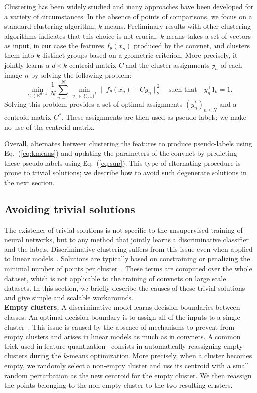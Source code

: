 Clustering has been widely studied and many approaches have been developed for a variety of circumstances. In the absence of points of comparisons,
we focus on a standard clustering algorithm, $k$-means. Preliminary results with other clustering algorithms indicates that this choice is not crucial.
$k$-means takes a set of vectors as input, in our case the features $f_\theta(x_n)$ produced by the convnet, and clusters them into $k$ distinct groups based on a geometric criterion.
More precisely, it jointly learns a $d\times k$ centroid matrix $C$ and the cluster assignments $y_n$ of each image $n$ by solving the following problem:
\begin{equation}
\label{eq:kmeans}
  \min_{C \in \mathbb{R}^{d\times k}}
  \frac{1}{N}
  \sum_{n=1}^N
  \min_{y_n \in \{0,1\}^{k}}
  \| f_\theta(x_n) -  C y_n \|_2^2
  \quad
  \text{such that}
  \quad
  y_n^\top 1_k = 1.
\end{equation}
Solving this problem provides a set of optimal assignments $(y_n^*)_{n\le N}$ and a centroid matrix $C^*$.
These assignments are then used as pseudo-labels; we make no use of the centroid matrix.

Overall, \OURS alternates between clustering the features to produce pseudo-labels using Eq.~(\ref{eq:kmeans})
and updating the parameters of the convnet by predicting these pseudo-labels using Eq.~(\ref{eq:sup}).
This type of alternating procedure is prone to trivial solutions; we describe how to avoid such degenerate solutions in the next section.


\subsection{Avoiding trivial solutions}
The existence of trivial solutions is not specific to the unsupervised training of neural networks, but to any method that jointly learns a discriminative classifier and the labels.
Discriminative clustering suffers from this issue even when applied to linear models~\cite{xu2005maximum}.
Solutions are typically based on constraining or penalizing the minimal number of points per cluster~\cite{bach2008diffrac,joulin2012convex}.
These terms are computed over the whole dataset, which is not applicable to the training of convnets on large scale datasets.
In this section, we briefly describe the causes of these trivial solutions and give simple and scalable workarounds.
\\

\noindent\textbf{Empty clusters.}
A discriminative model learns decision boundaries between classes.
An optimal decision boundary is to assign all of the inputs to a single cluster~\cite{xu2005maximum}.
This issue is caused by the absence of mechanisms to prevent from empty clusters and arises in linear models as much as in convnets.
A common trick used in feature quantization~\cite{johnson2017billion} consists in automatically reassigning empty clusters during the $k$-means optimization.
More precisely, when a cluster becomes empty, we randomly select a non-empty cluster and use its centroid with a small random perturbation as the new centroid for the empty cluster.
We then reassign the points belonging to the non-empty cluster to the two resulting clusters.
\\

